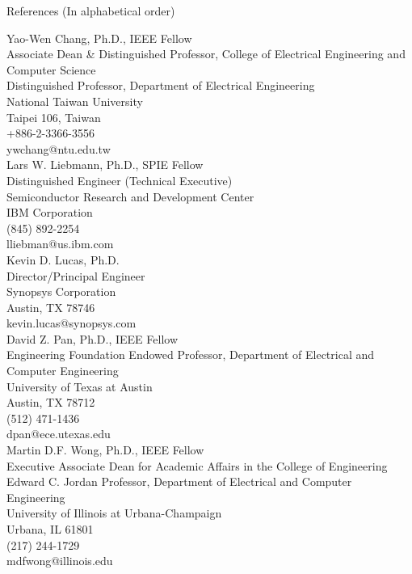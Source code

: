 
\begin{rSection}{References (In alphabetical order)}

Yao-Wen Chang, Ph.D., IEEE Fellow\\
Associate Dean \& Distinguished Professor, College of Electrical Engineering and Computer Science\\
Distinguished Professor, Department of Electrical Engineering\\
National Taiwan University\\
Taipei 106, Taiwan\\
+886-2-3366-3556\\
ywchang@ntu.edu.tw\\


Lars W. Liebmann, Ph.D., SPIE Fellow\\
Distinguished Engineer (Technical Executive)\\
Semiconductor Research and Development Center\\
IBM Corporation\\
(845) 892-2254\\
lliebman@us.ibm.com\\

Kevin D. Lucas, Ph.D.\\
Director/Principal Engineer\\
Synopsys Corporation\\
Austin, TX 78746\\
kevin.lucas@synopsys.com\\

David Z. Pan, Ph.D., IEEE Fellow\\
Engineering Foundation Endowed Professor, Department of Electrical and Computer Engineering\\
University of Texas at Austin\\
Austin, TX 78712\\
(512) 471-1436\\
dpan@ece.utexas.edu\\

Martin D.F. Wong, Ph.D., IEEE Fellow\\
Executive Associate Dean for Academic Affairs in the College of Engineering\\
Edward C. Jordan Professor, Department of Electrical and Computer Engineering \\
University of Illinois at Urbana-Champaign\\
Urbana, IL 61801\\
(217) 244-1729\\
mdfwong@illinois.edu\\


\end{rSection}

